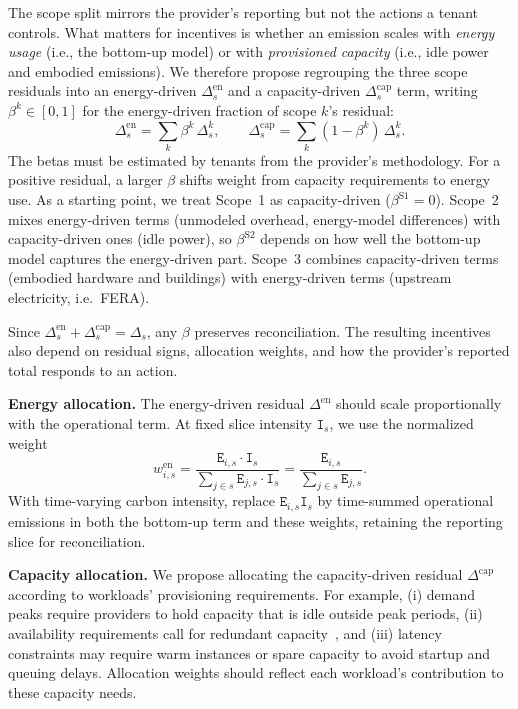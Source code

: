 \documentclass[sigconf,screen,nonacm]{acmart}
\newcommand{\parag}[1]{\vspace{2mm}\noindent\textbf{#1.}\hspace{2mm}}
\newcommand{\E}{\texttt{E}\xspace}
\newcommand{\I}{\texttt{I}\xspace}
\begin{document}
The scope split mirrors the provider's reporting but not the actions a tenant controls.
What matters for incentives is whether an emission scales with \emph{energy usage} (i.e., the bottom-up model) or with \emph{provisioned capacity} (i.e., idle power and embodied emissions).
We therefore propose regrouping the three scope residuals into an energy-driven $\Delta^{\text{en}}_{s}$ and a capacity-driven $\Delta^{\text{cap}}_{s}$ term, writing $\beta^{k}\in[0,1]$ for the energy-driven fraction of scope $k$'s residual:
\begin{equation}
\Delta^{\text{en}}_{s} = \sum_{k} \beta^{k}\,\Delta^{k}_{s}, \qquad
\Delta^{\text{cap}}_{s} = \sum_{k} (1-\beta^{k})\,\Delta^{k}_{s}.
\label{eq:residual-levers}
\end{equation}
The betas must be estimated by tenants from the provider's methodology.
For a positive residual, a larger $\beta$ shifts weight from capacity requirements to energy use.
As a starting point, we treat Scope~1 as capacity-driven ($\beta^{\text{S1}}=0$).
Scope~2 mixes energy-driven terms (unmodeled overhead, energy-model differences) with capacity-driven ones (idle power), so $\beta^{\text{S2}}$ depends on how well the bottom-up model captures the energy-driven part.
Scope~3 combines capacity-driven terms (embodied hardware and buildings) with energy-driven terms (upstream electricity, i.e.\ FERA).

Since $\Delta^{\text{en}}_s + \Delta^{\text{cap}}_s = \Delta_s$, any $\beta$ preserves reconciliation.
The resulting incentives also depend on residual signs, allocation weights, and how the provider's reported total responds to an action.

\parag{Energy allocation}
The energy-driven residual $\Delta^{\text{en}}$ should scale proportionally with the operational term.
At fixed slice intensity $\I_s$, we use the normalized weight
\begin{equation}
w^{\text{en}}_{i,s} = \frac{\E_{i,s}\cdot\I_s}{\sum_{j \in s} \E_{j,s}\cdot\I_s} = \frac{\E_{i,s}}{\sum_{j \in s} \E_{j,s}}.
\label{eq:w-energy}
\end{equation}
With time-varying carbon intensity, replace $\E_{i,s}\I_s$ by time-summed operational emissions in both the bottom-up term and these weights, retaining the reporting slice for reconciliation.

\parag{Capacity allocation}
We propose allocating the capacity-driven residual $\Delta^{\text{cap}}$ according to workloads' provisioning requirements.
For example, (i) demand peaks require providers to hold capacity that is idle outside peak periods, (ii) availability requirements call for redundant capacity~\cite{eilam2021transparent}, and (iii) latency constraints may require warm instances or spare capacity to avoid startup and queuing delays.
Allocation weights should reflect each workload’s contribution to these capacity needs.
\end{document}
